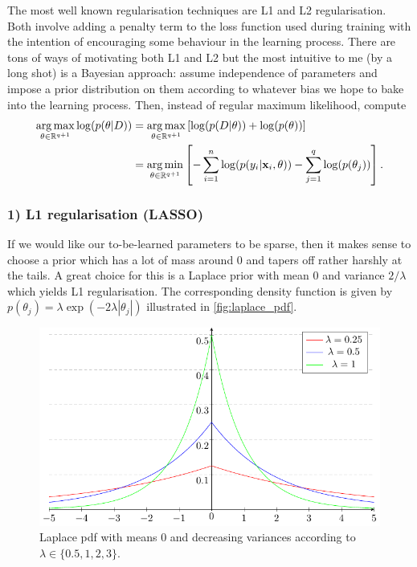 \documentclass[11pt]{article}
\begin{document}
The most well known regularisation techniques are L1 and L2 regularisation. Both involve adding a penalty term to the loss function used during training with the intention of encouraging some behaviour in the learning process. There are tons of ways of motivating both L1 and L2 but the most intuitive to me (by a long shot) is a Bayesian approach: assume independence of parameters and impose a prior distribution on them according to whatever bias we hope to bake into the learning process. Then, instead of regular maximum likelihood, compute
\begin{align*}
    \operatorname*{arg\,max}_{\theta\in\mathbb{R}^{q+1}}\log(p(\theta|D))
    &=
    \operatorname*{arg\,max}_{\theta\in\mathbb{R}^{q+1}}\left[\log(p(D|\theta))+\log(p(\theta))\right]\\
    &=
    \operatorname*{arg\,min}_{\theta\in\mathbb{R}^{q+1}}\left[-\sum_{i=1}^n\log(p(y_i|\mathbf{x}_i,\theta))-\sum_{j=1}^q\log(p(\theta_j))\right].
\end{align*}

\subsubsection*{1) L1 regularisation (LASSO)}
If we would like our to-be-learned parameters to be sparse, then it makes sense to choose a prior which has a lot of mass around 0 and tapers off rather harshly at the tails. A great choice for this is a Laplace prior with mean 0 and variance $2/\lambda$ which yields L1 regularisation. The corresponding density function is given by $p(\theta_j)=\lambda\exp(-2\lambda|\theta_j|)$ illustrated in \autoref{fig:laplace_pdf}.

\begin{figure}[t]
    \centering
    \includegraphics[width=\columnwidth]{./figures/supervised_learning/laplace_pdf.pdf}
    \caption{Laplace pdf with means 0 and decreasing variances according to $\lambda\in\{0.5,1,2,3\}$.}
    \label{fig:laplace_pdf}
\end{figure}
\end{document}
